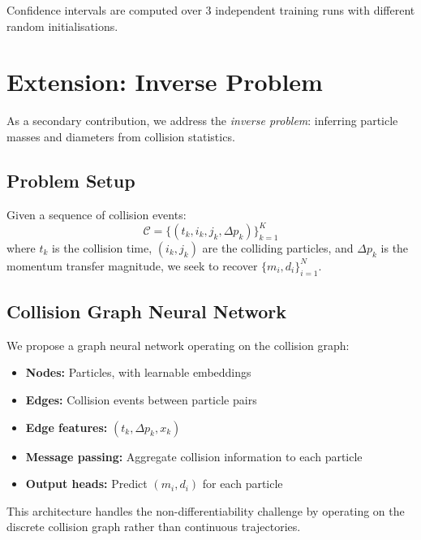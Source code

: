 \documentclass[11pt]{article}
\begin{document}
Confidence intervals are computed over 3 independent training runs with different random initialisations.

\section{Extension: Inverse Problem}

As a secondary contribution, we address the \textit{inverse problem}: inferring particle masses and diameters from collision statistics.

\subsection{Problem Setup}

Given a sequence of collision events:
\begin{equation}
    \mathcal{C} = \{(t_k, i_k, j_k, \Delta p_k)\}_{k=1}^{K}
\end{equation}
where $t_k$ is the collision time, $(i_k, j_k)$ are the colliding particles, and $\Delta p_k$ is the momentum transfer magnitude, we seek to recover $\{m_i, d_i\}_{i=1}^{N}$.

\subsection{Collision Graph Neural Network}

We propose a graph neural network operating on the collision graph:
\begin{itemize}
    \item \textbf{Nodes:} Particles, with learnable embeddings
    \item \textbf{Edges:} Collision events between particle pairs
    \item \textbf{Edge features:} $(t_k, \Delta p_k, x_k)$
    \item \textbf{Message passing:} Aggregate collision information to each particle
    \item \textbf{Output heads:} Predict $(m_i, d_i)$ for each particle
\end{itemize}

This architecture handles the non-differentiability challenge by operating on the discrete collision graph rather than continuous trajectories.

\end{document}

